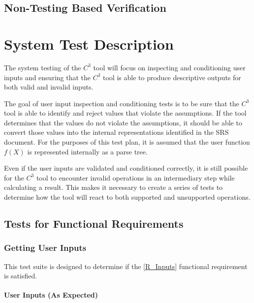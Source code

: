 \documentclass[12pt, titlepage]{article}
\newcommand{\prognameAbbrv}{$C^{3}$}
\begin{document}

\subsection{Non-Testing Based Verification}


\section{System Test Description}
The system testing of the \prognameAbbrv{} tool will focus on inspecting and 
conditioning user inputs and ensuring that the \prognameAbbrv{} tool is able to 
produce descriptive outputs for both valid and invalid inputs. 

The goal of user input inspection and conditioning tests is to be sure that the 
\prognameAbbrv{} tool is able to identify and reject values that violate the 
assumptions. If the tool determines that the values do not violate the 
assumptions, it should be able to convert those values into the internal 
representations identified in the SRS document. For the purposes of this test 
plan, it is assumed that the user function $f(X)$ is represented internally as 
a parse tree.

Even if the user inputs are validated and conditioned correctly, it is still 
possible for the \prognameAbbrv{} tool to encounter invalid operations in an 
intermediary step while calculating a result. This makes it necessary to create 
a series of tests to determine how the tool will react to both supported and 
unsupported operations.
	
\subsection{Tests for Functional Requirements}

\subsubsection{Getting User Inputs}
This test suite is designed to determine if the \ref{R_Inputs} functional 
requirement is satisfied.

\paragraph{User Inputs (As Expected)}
\end{document}
